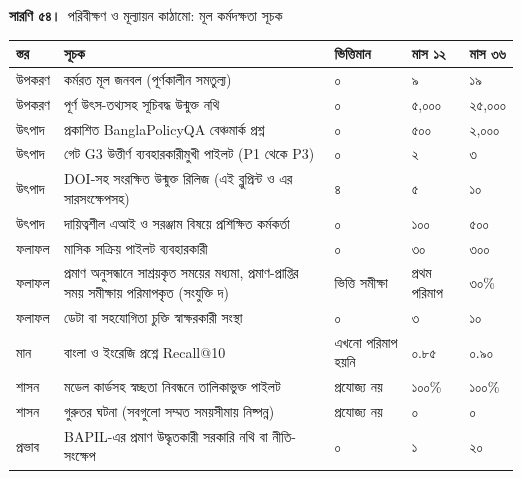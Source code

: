 \documentclass[border=10pt]{standalone}
\begin{document}
\begin{minipage}{17cm}
{\large\bfseries সারণি ৫৪।}\ {\large পরিবীক্ষণ ও মূল্যায়ন কাঠামো: মূল কর্মদক্ষতা সূচক}\par\vspace{7pt}
\small
{}
\begin{tabularx}{\linewidth}{@{}>{\hsize=0.714\hsize\raggedright\arraybackslash}X>{\hsize=2.202\hsize\raggedright\arraybackslash}X>{\hsize=0.655\hsize\raggedright\arraybackslash}X>{\hsize=0.714\hsize\raggedright\arraybackslash}X>{\hsize=0.714\hsize\raggedright\arraybackslash}X@{}}
\arrayrulecolor{bapilrule}\toprule
\rowcolor{white}\textbf{স্তর} & \textbf{সূচক} & \textbf{ভিত্তিমান} & \textbf{মাস ১২} & \textbf{মাস ৩৬} \\
\midrule
উপকরণ & কর্মরত মূল জনবল (পূর্ণকালীন সমতুল্য) & ০ & ৯ & ১৯ \\
উপকরণ & পূর্ণ উৎস-তথ্যসহ সূচিবদ্ধ উন্মুক্ত নথি & ০ & ৫,০০০ & ২৫,০০০ \\
উৎপাদ & প্রকাশিত BanglaPolicyQA বেঞ্চমার্ক প্রশ্ন & ০ & ৫০০ & ২,০০০ \\
উৎপাদ & গেট G3 উত্তীর্ণ ব্যবহারকারীমুখী পাইলট (P1 থেকে P3) & ০ & ২ & ৩ \\
উৎপাদ & DOI-সহ সংরক্ষিত উন্মুক্ত রিলিজ (এই ব্লুপ্রিন্ট ও এর সারসংক্ষেপসহ) & ৪ & ৫ & ১০ \\
উৎপাদ & দায়িত্বশীল এআই ও সরঞ্জাম বিষয়ে প্রশিক্ষিত কর্মকর্তা & ০ & ১০০ & ৫০০ \\
ফলাফল & মাসিক সক্রিয় পাইলট ব্যবহারকারী & ০ & ৩০ & ৩০০ \\
ফলাফল & প্রমাণ অনুসন্ধানে সাশ্রয়কৃত সময়ের মধ্যমা, প্রমাণ-প্রাপ্তির সময় সমীক্ষায় পরিমাপকৃত (সংযুক্তি দ) & ভিত্তি সমীক্ষা & প্রথম পরিমাপ & ৩০\% \\
ফলাফল & ডেটা বা সহযোগিতা চুক্তি স্বাক্ষরকারী সংস্থা & ০ & ৩ & ১০ \\
মান & বাংলা ও ইংরেজি প্রশ্নে Recall@10 & এখনো পরিমাপ হয়নি & ০.৮৫ & ০.৯০ \\
শাসন & মডেল কার্ডসহ স্বচ্ছতা নিবন্ধনে তালিকাভুক্ত পাইলট & প্রযোজ্য নয় & ১০০\% & ১০০\% \\
শাসন & গুরুতর ঘটনা (সবগুলো সম্মত সময়সীমায় নিষ্পন্ন) & প্রযোজ্য নয় & ০ & ০ \\
প্রভাব & BAPIL-এর প্রমাণ উদ্ধৃতকারী সরকারি নথি বা নীতি-সংক্ষেপ & ০ & ১ & ২০ \\
\bottomrule
\end{tabularx}
\par{}
\end{minipage}
\end{document}
